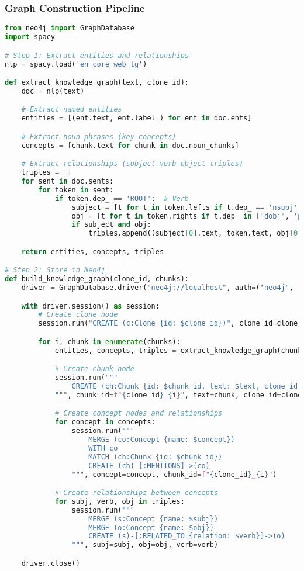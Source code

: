\documentclass[10pt]{article}
\begin{document}
\subsubsection{Graph Construction Pipeline}

\begin{lstlisting}[language=Python]
from neo4j import GraphDatabase
import spacy

# Step 1: Extract entities and relationships
nlp = spacy.load('en_core_web_lg')

def extract_knowledge_graph(text, clone_id):
    doc = nlp(text)

    # Extract named entities
    entities = [(ent.text, ent.label_) for ent in doc.ents]

    # Extract noun phrases (key concepts)
    concepts = [chunk.text for chunk in doc.noun_chunks]

    # Extract relationships (subject-verb-object triples)
    triples = []
    for sent in doc.sents:
        for token in sent:
            if token.dep_ == 'ROOT':  # Verb
                subject = [t for t in token.lefts if t.dep_ == 'nsubj']
                obj = [t for t in token.rights if t.dep_ in ['dobj', 'pobj']]
                if subject and obj:
                    triples.append((subject[0].text, token.text, obj[0].text))

    return entities, concepts, triples

# Step 2: Store in Neo4j
def build_knowledge_graph(clone_id, chunks):
    driver = GraphDatabase.driver("neo4j://localhost", auth=("neo4j", "password"))

    with driver.session() as session:
        # Create clone node
        session.run("CREATE (c:Clone {id: $clone_id})", clone_id=clone_id)

        for i, chunk in enumerate(chunks):
            entities, concepts, triples = extract_knowledge_graph(chunk, clone_id)

            # Create chunk node
            session.run("""
                CREATE (ch:Chunk {id: $chunk_id, text: $text, clone_id: $clone_id})
            """, chunk_id=f"{clone_id}_{i}", text=chunk, clone_id=clone_id)

            # Create concept nodes and relationships
            for concept in concepts:
                session.run("""
                    MERGE (co:Concept {name: $concept})
                    WITH co
                    MATCH (ch:Chunk {id: $chunk_id})
                    CREATE (ch)-[:MENTIONS]->(co)
                """, concept=concept, chunk_id=f"{clone_id}_{i}")

            # Create relationships between concepts
            for subj, verb, obj in triples:
                session.run("""
                    MERGE (s:Concept {name: $subj})
                    MERGE (o:Concept {name: $obj})
                    CREATE (s)-[:RELATED_TO {relation: $verb}]->(o)
                """, subj=subj, obj=obj, verb=verb)

    driver.close()
\end{lstlisting}
\end{document}
